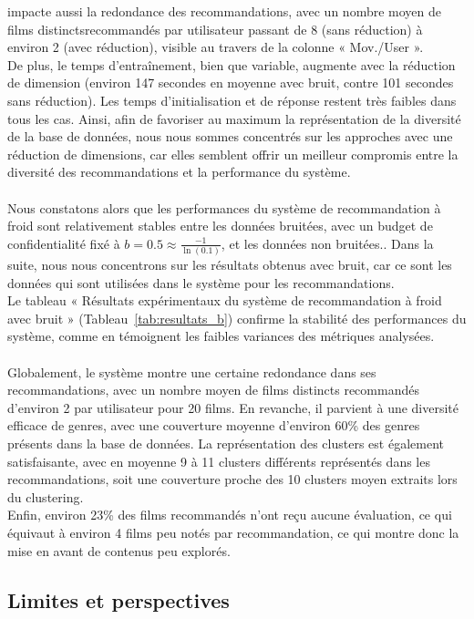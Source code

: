 \documentclass{article}
\begin{document}
impacte aussi la redondance des recommandations, avec un nombre moyen de films distinctsrecommandés par utilisateur passant de 8 (sans réduction) à environ 2 (avec réduction), visible au travers de la colonne « Mov./User ».\\
De plus, le temps d’entraînement, bien que variable, augmente avec la réduction de dimension (environ 147 secondes en moyenne avec bruit, contre 101 secondes sans réduction). Les temps d’initialisation et de réponse restent très faibles dans tous les cas.
Ainsi, afin de favoriser au maximum la représentation de la diversité de la base de données, nous nous sommes concentrés sur les approches avec une réduction de dimensions, car elles semblent offrir un meilleur compromis entre la diversité des recommandations et la performance du système.\\
\\
Nous constatons alors que les performances du système de recommandation à froid sont relativement stables entre les données bruitées, avec un budget de confidentialité fixé à $b = 0.5 \approx \frac{-1}{\ln(0.1)}$, et les données non bruitées.. Dans
la suite, nous nous concentrons sur les résultats obtenus avec bruit, car ce sont les données qui sont utilisées dans le système pour les recommandations.\\
Le tableau « Résultats expérimentaux du système de recommandation à froid avec bruit » (Tableau~\ref{tab:resultats_b}) confirme la stabilité des performances
du système, comme en témoignent les faibles variances des métriques analysées.\\
\\
Globalement, le système montre une certaine redondance dans ses recommandations, avec un nombre moyen de films distincts recommandés d’environ 2 par utilisateur pour 20 films. En revanche, il parvient à une
diversité efficace de genres, avec une couverture moyenne d’environ 60\% des genres présents dans la base de données.
La représentation des clusters est également satisfaisante, avec en moyenne 9 à 11 clusters différents représentés dans
les recommandations, soit une couverture proche des 10 clusters moyen extraits lors du clustering.\\
Enfin, environ 23\% des films recommandés n’ont reçu aucune évaluation, ce qui équivaut à environ 4 films peu notés par recommandation, ce qui montre donc la mise en avant de contenus peu explorés.\\

\subsection{Limites et perspectives}
\end{document}
